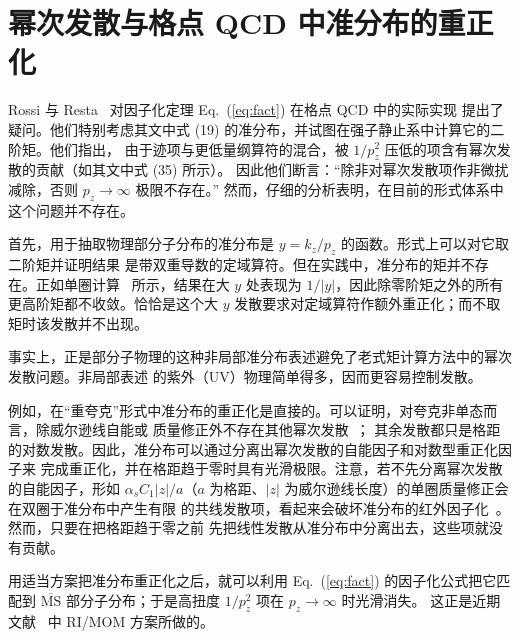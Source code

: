 \section{幂次发散与格点 QCD 中准分布的重正化}

Rossi 与 Resta~\cite{Rossi:2017muf} 对因子化定理 Eq.~(\ref{eq:fact}) 在格点 QCD 中的实际实现
提出了疑问。他们特别考虑其文中式 (19) 的准分布，并试图在强子静止系中计算它的二阶矩。他们指出，
由于迹项与更低量纲算符的混合，被 $1/p_z^2$ 压低的项含有幂次发散的贡献（如其文中式 (35) 所示）。
因此他们断言：``除非对幂次发散项作非微扰减除，否则 $p_z\rightarrow \infty$ 极限不存在。''
然而，仔细的分析表明，在目前的形式体系中这个问题并不存在。

首先，用于抽取物理部分子分布的准分布是 $y=k_z/p_z$ 的函数。形式上可以对它取二阶矩并证明结果
是带双重导数的定域算符。但在实践中，准分布的矩并不存在。正如单圈计算~\cite{Xiong:2013bka}
所示，结果在大 $y$ 处表现为 $1/|y|$，因此除零阶矩之外的所有更高阶矩都不收敛。恰恰是这个大 $y$
发散要求对定域算符作额外重正化；而不取矩时该发散并不出现。

事实上，正是部分子物理的这种非局部准分布表述避免了老式矩计算方法中的幂次发散问题。非局部表述
的紫外（UV）物理简单得多，因而更容易控制发散。

例如，在``重夸克''形式中准分布的重正化是直接的。可以证明，对夸克非单态而言，除威尔逊线自能或
质量修正外不存在其他幂次发散~\cite{Ishikawa:2016znu,Chen:2016fxx,Ji:2017oey,Ishikawa:2017faj,Green:2017xeu}；
其余发散都只是格距的对数发散。因此，准分布可以通过分离出幂次发散的自能因子和对数型重正化因子来
完成重正化，并在格距趋于零时具有光滑极限。注意，若不先分离幂次发散的自能因子，形如
$\alpha_s C_1|z|/a$（$a$ 为格距、$|z|$ 为威尔逊线长度）的单圈质量修正会在双圈于准分布中产生有限
的共线发散项，看起来会破坏准分布的红外因子化~\cite{Li:2016amo}。然而，只要在把格距趋于零之前
先把线性发散从准分布中分离出去，这些项就没有贡献。

用适当方案把准分布重正化之后，就可以利用 Eq.~(\ref{eq:fact}) 的因子化公式把它匹配到
$\overline{\text{MS}}$ 部分子分布；于是高扭度 $1/p_z^2$ 项在 $p_z\rightarrow \infty$ 时光滑消失。
这正是近期文献~\cite{Alexandrou:2017huk,Chen:2017mzz,Stewart:2017tvs} 中 RI/MOM 方案所做的。
